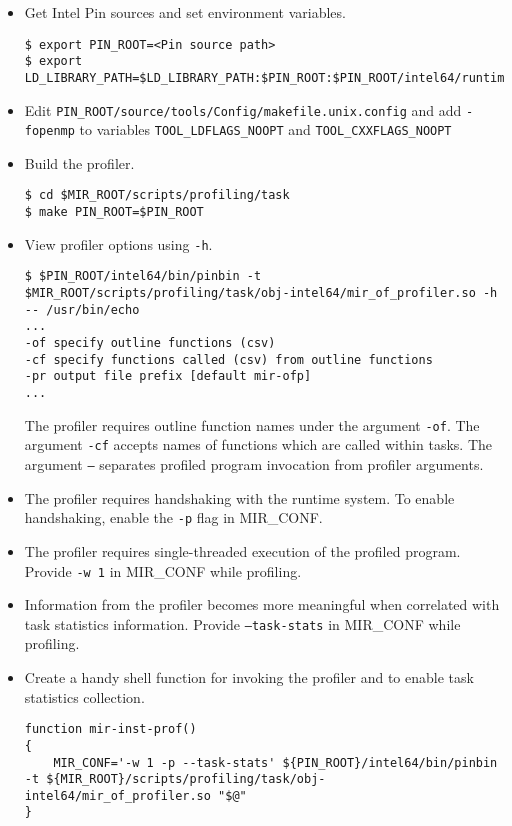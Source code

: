 \documentclass[11pt,a4paper]{article}
\begin{document}
\begin{itemize}
\item Get Intel Pin sources and set environment variables.

\begin{lstlisting}[style=MyInputStyle]
$ export PIN_ROOT=<Pin source path>
$ export LD_LIBRARY_PATH=$LD_LIBRARY_PATH:$PIN_ROOT:$PIN_ROOT/intel64/runtime
\end{lstlisting}

\item Edit \texttt{PIN\_ROOT/source/tools/Config/makefile.unix.config} and add \texttt{-fopenmp} to variables \texttt{TOOL\_LDFLAGS\_NOOPT}  and \texttt{TOOL\_CXXFLAGS\_NOOPT}

\item Build the profiler.

\begin{lstlisting}[style=MyInputStyle]
$ cd $MIR_ROOT/scripts/profiling/task
$ make PIN_ROOT=$PIN_ROOT
\end{lstlisting}

\item View profiler options using \texttt{-h}.

\begin{lstlisting}[style=MyInputStyle]
$ $PIN_ROOT/intel64/bin/pinbin -t $MIR_ROOT/scripts/profiling/task/obj-intel64/mir_of_profiler.so -h -- /usr/bin/echo
...
-of specify outline functions (csv)
-cf specify functions called (csv) from outline functions
-pr output file prefix [default mir-ofp]
...
\end{lstlisting}

The profiler requires outline function names under the argument \texttt{-of}. The argument \texttt{-cf} accepts names of functions which are called within tasks. The argument \texttt{--} separates profiled program invocation from profiler arguments.

\item The profiler requires handshaking with the runtime system. To enable handshaking, enable the \texttt{-p} flag in MIR\_CONF.

\item The profiler requires single-threaded execution of the profiled program. Provide \texttt{-w 1} in MIR\_CONF while profiling.

\item Information from the profiler becomes more meaningful when correlated with task statistics information. Provide \texttt{--task-stats} in MIR\_CONF while profiling.

\item Create a handy shell function for invoking the profiler and to enable task statistics collection.

\begin{lstlisting}[style=MyInputStyle]
function mir-inst-prof()
{
    MIR_CONF='-w 1 -p --task-stats' ${PIN_ROOT}/intel64/bin/pinbin -t ${MIR_ROOT}/scripts/profiling/task/obj-intel64/mir_of_profiler.so "$@"
}
\end{lstlisting}
\end{itemize}
\end{document}

